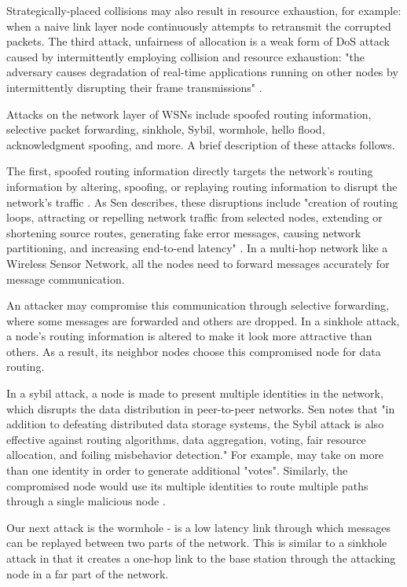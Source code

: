 \documentclass[12pt,a4paper,twoside]{report}
\begin{document}
Strategically-placed collisions may also result in resource exhaustion, for example: when a naive link layer node continuously attempts to retransmit the corrupted packets. The third attack, unfairness of allocation is a weak form of DoS attack caused by intermittently employing collision and resource exhaustion: "the adversary causes degradation of real-time applications running on other nodes by intermittently disrupting their frame transmissions" \cite{sen:2009}. \par\par
Attacks on the network layer of WSNs include spoofed routing information, selective packet forwarding, sinkhole, Sybil, wormhole, hello flood, acknowledgment spoofing, and more. A brief description of these attacks follows. \par
The first, spoofed routing information directly targets the network's routing information by altering, spoofing, or replaying routing information to disrupt the network's traffic \cite{sen:2009}. As Sen describes, these disruptions include "creation of routing loops, attracting or repelling network traffic from selected nodes, extending or shortening source routes, generating fake error messages, causing network partitioning, and increasing end-to-end latency" \cite{sen:2009}. In a multi-hop network like a Wireless Sensor Network, all the nodes need to forward messages accurately for message communication. \par
An attacker may compromise this communication through selective forwarding, where some messages are forwarded and others are dropped. In a sinkhole attack, a node's routing information is altered to make it look more attractive than others. As a result, its neighbor nodes choose this compromised node for data routing. \par
In a sybil attack, a node is made to present multiple identities in the network, which disrupts the data distribution in peer-to-peer networks. Sen notes that "in addition to defeating distributed data storage systems, the Sybil attack is also effective against routing algorithms, data aggregation, voting, fair resource allocation, and foiling misbehavior detection." For example, may take on more than one identity in order to generate additional "votes". Similarly, the compromised node would use its multiple identities to route multiple paths through a single malicious node \cite{sen:2009}. \par
Our next attack is the wormhole - is a low latency link through which messages can be replayed between two parts of the network. This is similar to a sinkhole attack in that it creates a one-hop link to the base station through the attacking node in a far part of the network. \par
\end{document}
